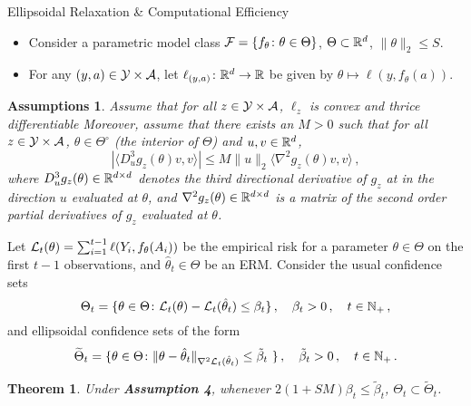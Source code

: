 \documentclass[final,notheorems,noamsthm,20pt]{beamer}
\newtheorem{theorem}{Theorem}
\newtheorem{assumption}{Assumptions}
\newlength{\colwidth}
\begin{document}
\begin{frame}[t]
\begin{columns}[t]
\begin{column}{\colwidth}
    \begin{block}{Ellipsoidal Relaxation \& Computational Efficiency}
        \begin{itemize}
            \item Consider a parametric model class $\mathcal{F} = \{f_\theta \colon \theta \in \Theta \}$, $\Theta \subset \mathbb{R}^d$, $\|\theta\|_2 \leq S$.
            \item For any $(y, a) \in \mathcal{Y} \times \mathcal{A}$, let $\ell_{(y,a)} \colon \mathbb{R}^d \to \mathbb{R}$ be given by $\theta \mapsto \ell(y, f_\theta(a))$.
        \end{itemize}
        \begin{assumption}\label{ass:concordance}
            Assume that for all $z \in \mathcal{Y}\times \mathcal{A}$, $\ell_z$ is convex and thrice differentiable Moreover, assume that there exists an $M>0$ such that for all $z \in \mathcal{Y}\times \mathcal{A}$, $\theta \in \Theta^\circ$ (the interior of $\Theta$) and $u,v \in \mathbb{R}^d$,
            $$
            |\langle D_u^3 g_z (\theta) v, v \rangle| \leq M\|u\|_2 \langle \nabla^2 g_z(\theta)v, v\rangle\,,
            $$
            where $D^3_u g_z(\theta) \in \mathbb{R}^{d \times d}$ denotes the third directional derivative of $g_z$ at in the direction $u$ evaluated at $\theta$, and $\nabla^2g_z(\theta) \in \mathbb{R}^{d \times d}$ is a matrix of the second order partial derivatives of $g_z$ evaluated at $\theta$.
        \end{assumption}
        Let $\mathcal{L}_t(\theta) = \sum_{i=1}^{t-1} \ell(Y_i, f_\theta(A_i))$ be the empirical risk for a parameter $\theta \in \Theta$ on the first $t-1$ observations, and $\hat\theta_t \in \Theta$ be an ERM. Consider the usual confidence sets
        $$
        \Theta_t = \{ \theta \in \Theta \colon \mathcal{L}_t(\theta) - \mathcal{L}_t(\hat\theta_t) \leq \beta_t\}\,, \quad \beta_t > 0\,, \quad t \in \mathbb{N}_+\,,
        $$
        and ellipsoidal confidence sets of the form
        $$
        \widetilde\Theta_t = \{ \theta \in \Theta \colon \|\theta - \hat\theta_t\|_{\nabla^2 \mathcal{L}_t(\hat\theta_t)} \leq \tilde\beta_t\ \}\,,\quad \tilde\beta_t > 0\,,\quad t \in \mathbb{N}_+\,.
        $$

        \begin{theorem}\label{thm:ellipsoidal-sets}
        Under \textbf{Assumption 4}, whenever $2(1+SM) \beta_t \leq \tilde\beta_t$, $\Theta_t \subset \widetilde\Theta_t$.
        \end{theorem}
    \end{block}


\end{column}
\end{columns}
\end{frame}
\end{document}
